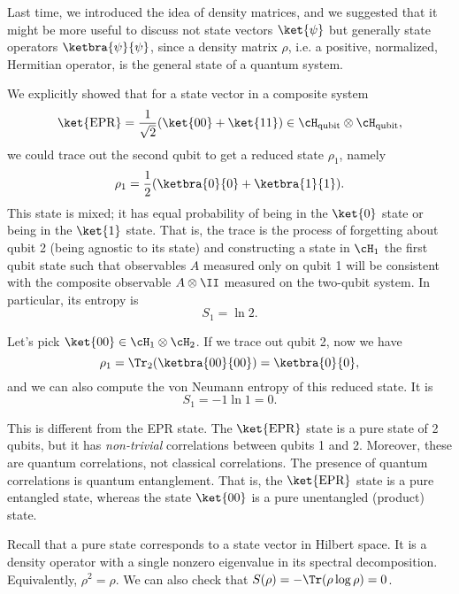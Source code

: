 Last time, we introduced the idea of density matrices, and we suggested that it might be more useful to discuss not state vectors $\ket{\psi}$ but generally state operators $\ketbra{\psi}{\psi}$, since a density matrix $\rho$, i.e. a positive, normalized, Hermitian operator, is the general state of a quantum system.

We explicitly showed that for a state vector in a composite system
\begin{equation}
    \ket{\text{EPR}} = \frac{1}{\sqrt{2}} (\ket{00} + \ket{11}) \in \cH_\text{qubit} \otimes \cH_\text{qubit},
\end{equation}
we could trace out the second qubit to get a reduced state $\rho_1$, namely
\begin{equation}
    \rho_1 = \frac{1}{2} (\ketbra{0}{0} + \ketbra{1}{1}).
\end{equation}
This state is mixed; it has equal probability of being in the $\ket{0}$ state or being in the $\ket{1}$ state. That is, the trace is the process of forgetting about qubit 2 (being agnostic to its state) and constructing a state in $\cH_1$ the first qubit state such that observables $A$ measured only on qubit 1 will be consistent with the composite observable $A\otimes \II$ measured on the two-qubit system. In particular, its entropy is
\begin{equation}
    S_1 = \ln 2.
\end{equation}

Let's pick $\ket{00}\in \cH_1 \otimes \cH_2$. If we trace out qubit 2, now we have
\begin{equation}
    \rho_1 = \Tr_2 (\ketbra{00}{00}) = \ketbra{0}{0},
\end{equation}
and we can also compute the von Neumann entropy of this reduced state. It is
\begin{equation}
    S_1 = -1 \ln 1= 0.
\end{equation}

This is different from the EPR state. The $\ket{\text{EPR}}$ state is a pure state of 2 qubits, but it has \emph{non-trivial} correlations between qubits 1 and 2. Moreover, these are quantum correlations, not classical correlations. The presence of quantum correlations is quantum entanglement. That is, the $\ket{\text{EPR}}$ state is a pure entangled state, whereas the state $\ket{00}$ is a pure unentangled (product) state.

Recall that a pure state corresponds to a state vector in Hilbert space. It is a density operator with a single nonzero eigenvalue in its spectral decomposition. Equivalently, $\rho^2=\rho$. We can also check that $S(\rho) = -\Tr(\rho \log \rho)=0$.


